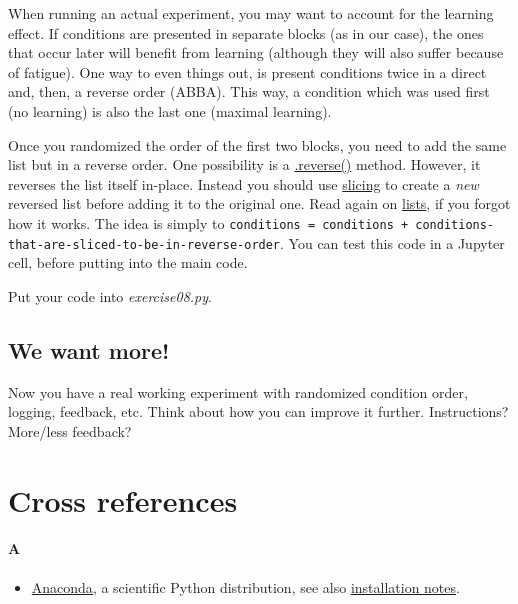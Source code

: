 \documentclass[
]{book}
\providecommand{\tightlist}{%
  \setlength{\itemsep}{0pt}\setlength{\parskip}{0pt}}
\begin{document}
When running an actual experiment, you may want to account for the learning effect. If conditions are presented in separate blocks (as in our case), the ones that occur later will benefit from learning (although they will also suffer because of fatigue). One way to even things out, is present conditions twice in a direct and, then, a reverse order (ABBA). This way, a condition which was used first (no learning) is also the last one (maximal learning).

Once you randomized the order of the first two blocks, you need to add the same list but in a reverse order. One possibility is a \href{https://docs.python.org/3/tutorial/datastructures.html}{.reverse()} method. However, it reverses the list itself in-place. Instead you should use \href{https://docs.python.org/3/reference/expressions.html?highlight=slicing\#slicings}{slicing} to create a \emph{new} reversed list before adding it to the original one. Read again on \protect\hyperlink{lists}{lists}, if you forgot how it works. The idea is simply to \texttt{conditions\ =\ conditions\ +\ conditions-that-are-sliced-to-be-in-reverse-order}. You can test this code in a Jupyter cell, before putting into the main code.

Put your code into \emph{exercise08.py}.

\hypertarget{we-want-more}{%
\section{We want more!}\label{we-want-more}}

Now you have a real working experiment with randomized condition order, logging, feedback, etc. Think about how you can improve it further. Instructions? More/less feedback?

\hypertarget{cross-references}{%
\chapter*{Cross references}\label{cross-references}}

\hypertarget{a}{%
\subsubsection*{A}\label{a}}

\begin{itemize}
\tightlist
\item
  \href{https://www.anaconda.com}{Anaconda}, a scientific Python distribution, see also \protect\hyperlink{install-anaconda}{installation notes}.
\end{itemize}
\end{document}
